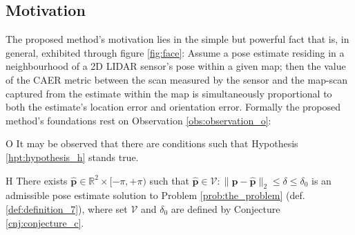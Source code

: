 \subsection{Motivation}

The proposed method's motivation lies in the simple but powerful fact that is,
in general, exhibited through figure \ref{fig:face}: Assume a pose estimate
residing in a neighbourhood of a 2D LIDAR sensor's pose within a given map;
then the value of the CAER metric between the scan measured by the sensor and
the map-scan captured from the estimate within the map is simultaneously
proportional to both the estimate's location error and orientation error.
Formally the proposed method's foundations rest on Observation
\ref{obs:observation_o}:

\begin{customobs}{O}
  \label{obs:observation_o} It may be observed that there are conditions such
  that Hypothesis \ref{hpt:hypothesis_h} stands true.
\end{customobs}

\begin{customhpt}{H}
  \label{hpt:hypothesis_h}
  There exists $\hat{\bm{p}} \in  \mathbb{R}^2 \times [-\pi,+\pi)$ such that
  $\hat{\bm{p}} \in \mathcal{V}: \|\bm{p}-\hat{\bm{p}}\|_2 \leq \delta \leq \delta_0$
  is an admissible pose estimate solution to Problem \ref{prob:the_problem}
  (def. \ref{def:definition_7}), where set $\mathcal{V}$ and $\delta_0$ are
  defined by Conjecture
  \ref{cnj:conjecture_c}.
\end{customhpt}

